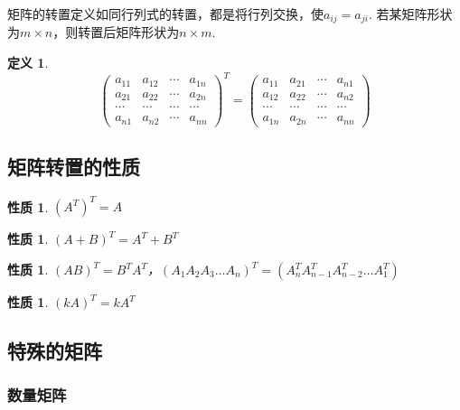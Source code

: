 \documentclass[12pt, a4paper, oneside]{ctexbook}
\newtheorem{definition}[theorem]{定义}
\newtheorem{quolity}[theorem]{性质}
\begin{document}
矩阵的转置定义如同行列式的转置，都是将行列交换，使$a_{ij} = a_{ji}$. 若某矩阵形状为$m \times n$，则转置后矩阵形状为$n \times m$. 

\begin{definition}
    $$\left ( \begin{matrix}
        a_{11} & a_{12} & \cdots & a_{1n} \\
        a_{21} & a_{22} & \cdots & a_{2n} \\
        \cdots & \cdots & \cdots & \cdots \\
        a_{n1} & a_{n2} & \cdots & a_{nn}
    \end{matrix} \right )^T = \left ( \begin{matrix}
        a_{11} & a_{21} & \cdots & a_{n1} \\
        a_{12} & a_{22} & \cdots & a_{n2} \\
        \cdots & \cdots & \cdots & \cdots \\
        a_{1n} & a_{2n} & \cdots & a_{nn}
    \end{matrix} \right )$$
\end{definition}

\subsection{矩阵转置的性质}

\begin{quolity}
    $(A^T)^T = A$
\end{quolity}

\begin{quolity}
    $(A + B)^T = A^T + B^T$
\end{quolity}

\begin{quolity}
    $(AB)^T = B^TA^T$，$(A_1A_2A_3 \dots A_n)^T = (A_n^TA_{n-1}^TA_{n-2}^T \dots A_1^T)$
\end{quolity}

\begin{quolity}
    $(kA)^T = kA^T$
\end{quolity}

\subsection{特殊的矩阵}

\subsubsection{数量矩阵}
\end{document}
